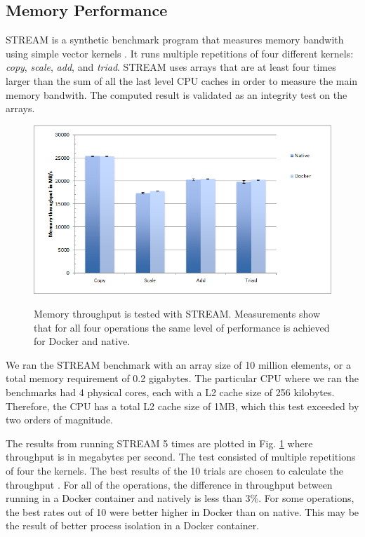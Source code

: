 \documentclass[11pt]{article}
\begin{document}
	\subsection{Memory Performance}
	STREAM is a synthetic benchmark program that measures memory bandwith using simple vector kernels \cite{mccalpin}. It runs multiple repetitions of four different kernels: \textit{copy}, \textit{scale}, \textit{add}, and \textit{triad}. STREAM uses arrays that are at least four times larger than the sum of all the last level CPU caches in order to measure the main memory bandwith. The computed result is validated as an integrity test on the arrays. 
	
	\begin{figure}
		\centering
		{\includegraphics[width=150mm]{mem}}
		\caption{  Memory throughput is tested with STREAM. Measurements show
			that for all four operations the same level of performance is achieved for Docker and native. }
		\label{fig:mem}
	\end{figure}
	
	
	We ran the
	STREAM benchmark with an array size of 10 million elements, or
	a total memory requirement of 0.2 gigabytes. The particular CPU
	where we ran the benchmarks had 4 physical cores, each with a L2 cache size of 256 kilobytes. 
	Therefore, the CPU has a total L2 cache size of 1MB, which this test exceeded by
	two orders of magnitude.
	
	The results from running STREAM 5 times are plotted in Fig. \ref{fig:mem} where throughput is in megabytes per second. 
	The test consisted of multiple repetitions of four the kernels. The best results of the 10 trials are chosen to calculate the throughput \cite{mccalpin}. 
	For all of the operations, the difference in throughput between running in a Docker container and natively is less than 3\%. For some operations, the best rates out of 10 were better higher in Docker than on native. This may be the result of better process isolation in a Docker container. 
	
\end{document}
